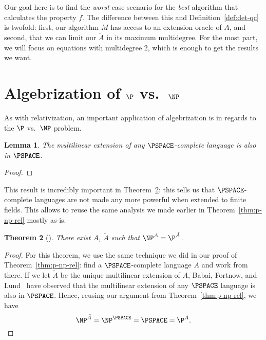 \documentclass{reedthesis}
\theoremstyle{plain}
\newtheorem{thm}{Theorem}[section]
\newtheorem{lemma}[thm]{Lemma}
\theoremstyle{definition}
\theoremstyle{remark}
\numberwithin{equation}{section}
\begin{document}
Our goal here is to find the \emph{worst}-case scenario for the \emph{best}
algorithm that calculates the property $f$. The difference between this and
Definition~\ref{def:det-qc} is twofold: first, our algorithm $M$ has access to
an extension oracle of $A$, and second, that we can limit our $\tilde{A}$ in
its maximum multidegree. For the most part, we will focus on equations with
multidegree 2, which is enough to get the results we want.


\section{Algebrization of $\P$ vs.\ $\NP$}\label{sec:alg-p-np}

As with relativization, an important application of algebrization is in regards
to the $\P$ vs.\ $\NP$ problem.

\begin{lemma} %
  The multilinear extension of any $\PSPACE$-complete language is also in
  $\PSPACE$.
\end{lemma}

\begin{proof}
\end{proof}

This result is incredibly important in Theorem~\ref{thm:p-np-alg}: this tells us
that $\PSPACE$-complete languages are not made any more powerful when extended
to finite fields. This allows to reuse the same analysis we made earlier in
Theorem~\ref{thm:p-np-rel} mostly as-is.

\begin{thm}[{\cite[Theorem 5.1]{AW09}}]\label{thm:p-np-alg}
  There exist $A$, $\tilde{A}$ such that $\NP^{A} = \P^{\tilde{A}}$.
\end{thm}

\begin{proof}
  For this theorem, we use the same technique we did in our proof of
  Theorem~\ref{thm:p-np-rel}: find a $\PSPACE$-complete language $A$ and work
  from there. If we let $\tilde{A}$ be the unique multilinear extension of $A$,
  Babai, Fortnow, and Lund~\cite{BFL90} have observed that the multilinear
  extension of any $\PSPACE$ language is also in $\PSPACE$. Hence, reusing our
  argument from Theorem~\ref{thm:p-np-rel}, we have
  \begin{equation}
    \NP^{\tilde{A}} = \NP^{\PSPACE} = \PSPACE = \P^{A}.
  \end{equation}
\end{proof}
\end{document}

